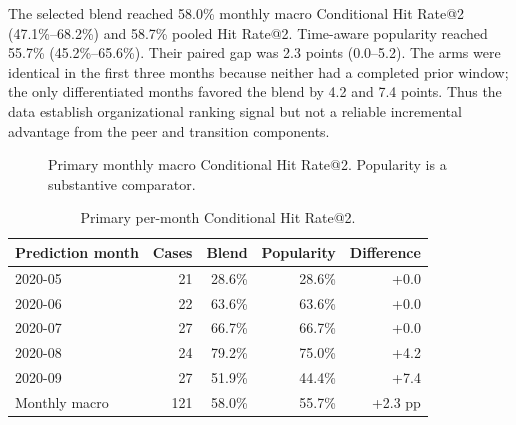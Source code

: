 \documentclass[runningheads]{llncs}
\begin{document}
The selected blend reached 58.0\% monthly macro Conditional Hit Rate@2 (47.1\%--68.2\%) and 58.7\% pooled Hit Rate@2. Time-aware popularity reached 55.7\% (45.2\%--65.6\%). Their paired gap was 2.3 points (0.0--5.2). The arms were identical in the first three months because neither had a completed prior window; the only differentiated months favored the blend by 4.2 and 7.4 points. Thus the data establish organizational ranking signal but not a reliable incremental advantage from the peer and transition components.

\begin{figure}[t]
\centering
{}
\caption{Primary monthly macro Conditional Hit Rate@2. Popularity is a substantive comparator.}
\label{fig:results}
\end{figure}

\begin{table}[t]
\caption{Primary per-month Conditional Hit Rate@2.}
\label{tab:monthly}
\centering
\small
\begin{tabular}{@{}lrrrr@{}}
\hline
\textbf{Prediction month} & \textbf{Cases} & \textbf{Blend} & \textbf{Popularity} & \textbf{Difference} \\
\hline
2020-05 & 21 & 28.6\% & 28.6\% & +0.0 \\
2020-06 & 22 & 63.6\% & 63.6\% & +0.0 \\
2020-07 & 27 & 66.7\% & 66.7\% & +0.0 \\
2020-08 & 24 & 79.2\% & 75.0\% & +4.2 \\
2020-09 & 27 & 51.9\% & 44.4\% & +7.4 \\
\hline
Monthly macro & 121 & 58.0\% & 55.7\% & +2.3 pp \\
\hline
\end{tabular}
\end{table}
\end{document}
